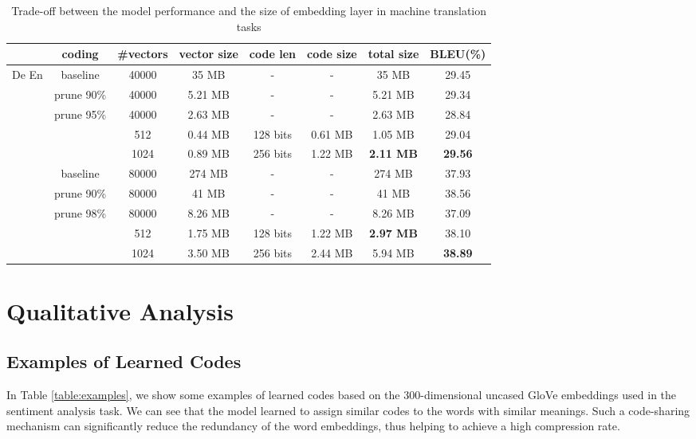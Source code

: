\documentclass{article} \usepackage{iclr2018_conference_review,times}
\begin{document}
\begin{table}[h]
\begin{center}
    \begin{tabular}{c|c|c|c|c|c|c|c}
    \hline \hline
    & {\bf coding} & {\bf \#vectors}  & {\bf vector size} & {\bf code len} & {\bf code size} & {\bf total size} & {\bf \small BLEU(\%)} \\
    \hline
    \multirow{6 }{*}{\small De  En} & baseline & 40000 & 35 MB & - & - & 35 MB & 29.45 \\
    \cline{2-8}
    & prune 90\% & 40000 & 5.21 MB & - & - & 5.21 MB & 29.34 \\
    & prune 95\% & 40000 & 2.63 MB & - & - & 2.63 MB & 28.84 \\
    \cline{2-8}
    &  & 512 & 0.44 MB & 128 bits & 0.61 MB & 1.05 MB & 29.04 \\
&  & 1024 & 0.89 MB & 256 bits & 1.22 MB & {\bf 2.11 MB} & {\bf 29.56} \\
    \hline
    \multirow{6}{*}{\small En  Ja} & baseline & 80000 & 274 MB & - & - & 274 MB & 37.93 \\
    \cline{2-8}
    & prune 90\% & 80000 & 41 MB & - & - & 41 MB & 38.56 \\
& prune 98\% & 80000 & 8.26 MB & - & - & 8.26 MB & 37.09 \\
    \cline{2-8}

    &  & 512 & 1.75 MB & 128 bits & 1.22 MB & {\bf 2.97 MB} & 38.10 \\
    &  & 1024 & 3.50 MB & 256 bits & 2.44 MB & {5.94 MB} & {\bf 38.89} \\
    \hline \hline
    \end{tabular}
    \caption{Trade-off between the model performance and the size of embedding layer in machine translation tasks}
    \label{table:mt}
\end{center}
\end{table}


\section{Qualitative Analysis}

\subsection{Examples of Learned Codes}

In Table \ref{table:examples}, we show some examples of learned codes based on the 300-dimensional uncased GloVe embeddings used in the sentiment analysis task. We can see that the model learned to assign similar codes to the words with similar meanings. Such a code-sharing mechanism can significantly reduce the redundancy of the word embeddings, thus helping to achieve a high compression rate.
\end{document}

